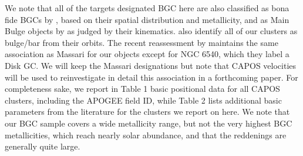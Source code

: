 \documentclass[onecolumn]{aa}
\begin{document}
We note that all of the targets designated BGC here are also classified as bona fide BGCs by \citet{Bica2016}, based on their spatial distribution and  metallicity, and as Main Bulge objects by \citet{Massari2019} as judged by their kinematics. \citet{Perez-Villegas2020} also identify all of our clusters as bulge/bar from their orbits. The recent reassessment by \citet{Bajkova2020} maintains the same association as Massari for our objects except for NGC 6540, which they label a Disk GC. 
We will keep the Massari designations but note that CAPOS velocities will be used to reinvestigate in detail this association in a forthcoming paper.
For completeness sake, we report in Table 1 basic positional data for all CAPOS clusters, including the APOGEE field ID, while Table 2 lists additional basic parameters from the literature for the clusters we report on here. We note that our BGC sample covers a wide metallicity range, but not the very highest BGC metallicities, which reach nearly solar abundance, and that the reddenings are generally quite large.
\end{document}
